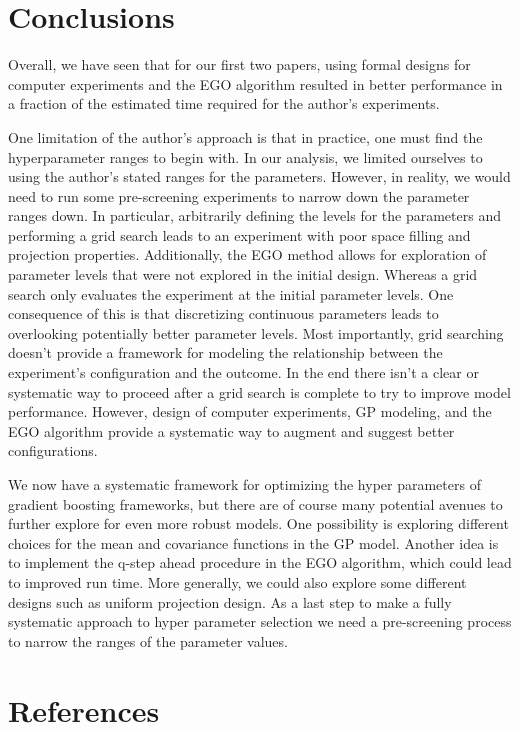 \documentclass[12pt]{article}
\begin{document}
 
\section{Conclusions}
Overall, we have seen that for our first two papers, using formal designs for computer experiments and the EGO algorithm resulted in better performance in a fraction of the estimated time required for the author's experiments. 

One limitation of the author's approach is that in practice, one must find the hyperparameter ranges to begin with. In our analysis, we limited ourselves to using the author's stated ranges for the parameters. However, in reality, we would need to run some pre-screening experiments to narrow down the parameter ranges down. In particular, arbitrarily defining the levels for the parameters and performing a grid search leads to an experiment with poor space filling and projection properties. Additionally, the EGO method allows for exploration of parameter levels that were not explored in the initial design. Whereas a grid search only evaluates the experiment at the initial parameter levels. One consequence of this is that  discretizing continuous parameters leads to overlooking potentially better parameter levels. Most importantly, grid searching doesn't provide a framework for modeling the relationship between the experiment's configuration and the outcome. In the end there isn't a clear or systematic way to proceed after a grid search is complete to try to improve model performance. However, design of computer experiments, GP modeling, and the EGO algorithm provide a systematic way to augment and suggest better configurations.

We now have a systematic framework for optimizing the hyper parameters of gradient boosting frameworks, but there are of course many potential avenues to further explore for even more robust models. One possibility is exploring different choices for the mean and covariance functions in the GP model. Another idea is to implement the q-step ahead procedure in the EGO algorithm, which could lead to improved run time. More generally, we could also explore some different designs such as uniform projection design.  As a last step to make a fully systematic approach to hyper parameter selection we need a pre-screening process to narrow the ranges of the parameter values.

\newpage 
\section{References}
\end{document}
